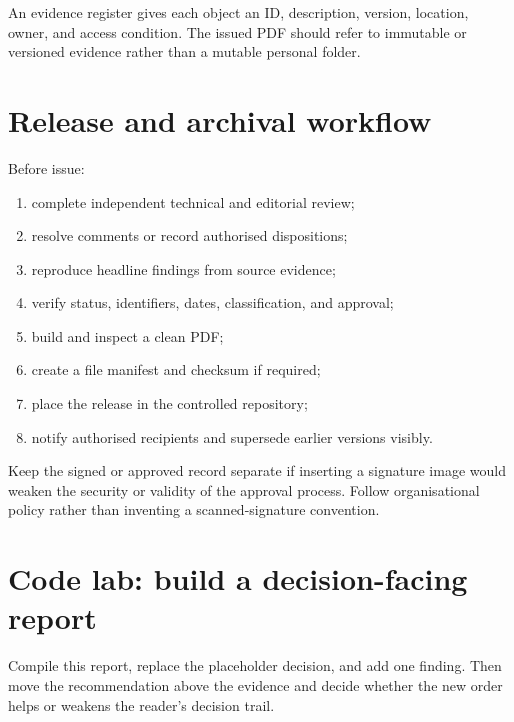 An evidence register gives each object an ID, description, version, location,
owner, and access condition. The issued PDF should refer to immutable or
versioned evidence rather than a mutable personal folder.

\section{Release and archival workflow}

Before issue:

\begin{enumerate}
  \item complete independent technical and editorial review;
  \item resolve comments or record authorised dispositions;
  \item reproduce headline findings from source evidence;
  \item verify status, identifiers, dates, classification, and approval;
  \item build and inspect a clean PDF;
  \item create a file manifest and checksum if required;
  \item place the release in the controlled repository;
  \item notify authorised recipients and supersede earlier versions visibly.
\end{enumerate}

Keep the signed or approved record separate if inserting a signature image would
weaken the security or validity of the approval process. Follow organisational
policy rather than inventing a scanned-signature convention.

\section{Code lab: build a decision-facing report}

\begin{codelab}
Compile this report, replace the placeholder decision, and add one finding.
Then move the recommendation above the evidence and decide whether the new
order helps or weakens the reader's decision trail.
\end{codelab}

